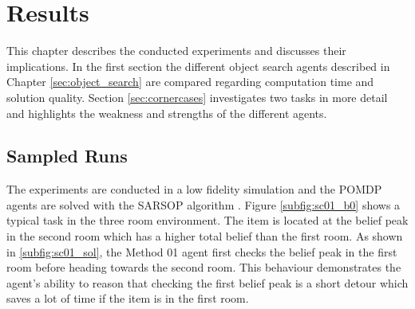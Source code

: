 \chapter{Results}
\label{sec:results}

This chapter describes the conducted experiments and discusses their implications. In the first section the different object search agents described in Chapter \ref{sec:object_search} are compared regarding computation time and solution quality. Section \ref{sec:cornercases} investigates two tasks in more detail and highlights the weakness and strengths of the different agents.

\section{Sampled Runs}
The experiments are conducted in a low fidelity simulation and the POMDP agents are solved with the SARSOP algorithm \cite{6284837}. Figure \ref{subfig:sc01_b0} shows a typical task in the three room environment. The item is located at the belief peak in the second room which has a higher total belief than the first room. As shown in \ref{subfig:sc01_sol}, the Method 01 agent first checks the belief peak in the first room before heading towards the second room. This behaviour demonstrates the agent's ability to reason that checking the first belief peak is a short detour which saves a lot of time if the item is in the first room.\\

